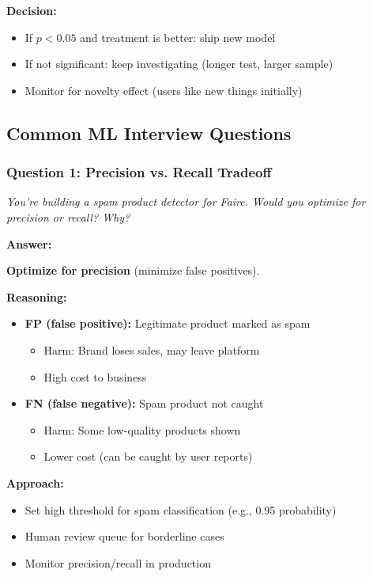 \documentclass[11pt,letterpaper]{article}
\begin{document}
\textbf{Decision:}
\begin{itemize}
    \item If $p < 0.05$ and treatment is better: ship new model
    \item If not significant: keep investigating (longer test, larger sample)
    \item Monitor for novelty effect (users like new things initially)
\end{itemize}

\subsection{Common ML Interview Questions}

\subsubsection{Question 1: Precision vs. Recall Tradeoff}

\textit{You're building a spam product detector for Faire. Would you optimize for precision or recall? Why?}

\textbf{Answer:}

\textbf{Optimize for precision} (minimize false positives).

\textbf{Reasoning:}
\begin{itemize}
    \item \textbf{FP (false positive):} Legitimate product marked as spam
    \begin{itemize}
        \item Harm: Brand loses sales, may leave platform
        \item High cost to business
    \end{itemize}
    \item \textbf{FN (false negative):} Spam product not caught
    \begin{itemize}
        \item Harm: Some low-quality products shown
        \item Lower cost (can be caught by user reports)
    \end{itemize}
\end{itemize}

\textbf{Approach:}
\begin{itemize}
    \item Set high threshold for spam classification (e.g., 0.95 probability)
    \item Human review queue for borderline cases
    \item Monitor precision/recall in production
\end{itemize}
\end{document}
